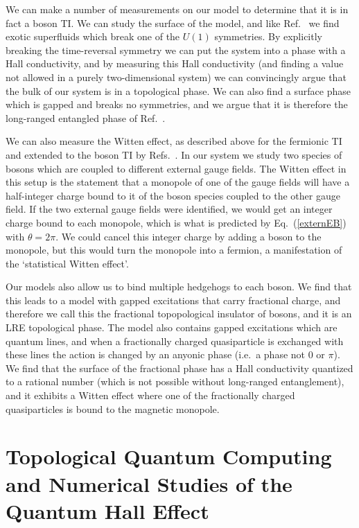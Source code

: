 We can make a number of measurements on our model to determine that it is in fact a boson TI. We can study the surface of the model, and like Ref.~\cite{SenthilVishwanath} we find exotic superfluids which break one of the $U(1)$ symmetries. By explicitly breaking the time-reversal symmetry we can put the system into a phase with a Hall conductivity, and by measuring this Hall conductivity (and finding a value not allowed in a purely two-dimensional system) we can convincingly argue that the bulk of our system is in a topological phase. We can also find a surface phase which is gapped and breaks no symmetries, and we argue that it is therefore the long-ranged entangled phase of Ref.~\cite{SenthilVishwanath}.

We can also measure the Witten effect, as described above for the fermionic TI and extended to the boson TI by Refs.~\cite{Max,MaxWitten}. In our system we study two species of bosons which are coupled to different external gauge fields. The Witten effect in this setup is the statement that a monopole of one of the gauge fields will have a half-integer charge bound to it of the boson species coupled to the other gauge field. If the two external gauge fields were identified, we would get an integer charge bound to each monopole, which is what is predicted by Eq.~(\ref{externEB}) with $\theta=2\pi$. We could cancel this integer charge by adding a boson to the monopole, but this would turn the monopole into a fermion, a manifestation of the `statistical Witten effect'\cite{Max,MaxWitten}.

Our models also allow us to bind multiple hedgehogs to each boson. We find that this leads to a model with gapped excitations that carry fractional charge, and therefore we call this the fractional topopological insulator of bosons, and it is an LRE topological phase. The model also contains gapped excitations which are quantum lines, and when a fractionally charged quasiparticle is exchanged with these lines the action is changed by an anyonic phase (i.e.~a phase not $0$ or $\pi$). We find that the surface of the fractional phase has a Hall conductivity quantized to a rational number (which is not possible without long-ranged entanglement), and it exhibits a Witten effect where one of the fractionally charged quasiparticles is bound to the magnetic monopole.

\section{Topological Quantum Computing and Numerical Studies of the Quantum Hall Effect}

